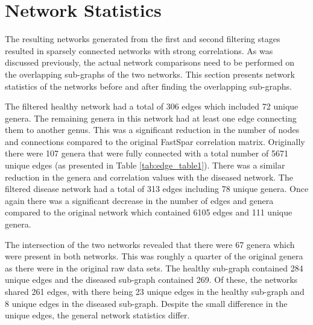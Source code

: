 \section{Network Statistics}\label{results-netstat}

The resulting networks generated from the first and second filtering stages resulted in sparsely connected networks with strong correlations. As was discussed previously, the actual network comparisons need to be performed on the overlapping sub-graphs of the two networks. This section presents network statistics of the networks before and after finding the overlapping sub-graphs. 

The filtered healthy network had a total of 306 edges which included 72 unique genera. The remaining genera in this network had at least one edge connecting them to another genus. This was a significant reduction in the number of nodes and connections compared to the original \acrshort{FastSpar} correlation matrix. Originally there were 107 genera that were fully connected with a total number of 5671 unique edges (as presented in Table \ref{tab:edge_table1}). There was a similar reduction in the genera and correlation values with the diseased network. The filtered disease network had a total of 313 edges including 78 unique genera. Once again there was a significant decrease in the number of edges and genera compared to the original network which contained 6105 edges and 111 unique genera.

The intersection of the two networks revealed that there were 67 genera which were present in both networks. This was roughly a quarter of the original genera as there were in the original raw data sets. The healthy sub-graph contained 284 unique edges and the diseased sub-graph contained 269. Of these, the networks shared 261 edges, with there being 23 unique edges in the healthy sub-graph and 8 unique edges in the diseased sub-graph. Despite the small difference in the unique edges, the general network statistics differ. 

